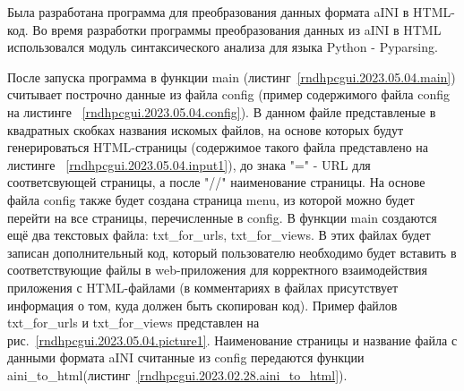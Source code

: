 \def\notedate{2023.05.04}
\def\currentauthor{Василян А.Р. (РК6-83Б)}



Была разработана программа для преобразования данных формата \textsf{aINI} в \textsf{HTML}-код. Во время разработки программы преобразования данных из \textsf{aINI} в \textsf{HTML} использовался модуль синтаксического анализа для языка \textsf{Python} - \textsf{Pyparsing}. 

После запуска программа в функции \textsf{main} (листинг~\ref{rndhpcgui.2023.05.04.main}) считывает построчно данные из файла \textsf{config} (пример содержимого файла \textsf{config} на листинге ~\ref{rndhpcgui.2023.05.04.config}). В данном файле представленые в квадратных скобках названия искомых файлов, на основе которых будут генерироваться \textsf{HTML}-страницы (содержимое такого файла представлено на листинге ~\ref{rndhpcgui.2023.05.04.input1}), до знака "=" - \textsf{URL} для соответсвующей страницы, а после "//" наименование страницы. На основе файла \textsf{config} также будет создана страница menu, из которой можно будет перейти на все страницы, перечисленные в \textsf{config}. В функции \textsf{main} создаются ещё два текстовых файла: \textsf{txt_for_urls}, \textsf{txt_for_views}. В этих файлах будет записан дополнительный код, который пользователю необходимо будет вставить в соответствующие файлы в \textsf{web}-приложения для корректного взаимодействия приложения с \textsf{HTML}-файлами (в комментариях в файлах присутствует информация о том, куда должен быть скопирован код). Пример файлов \textsf{txt_for_urls} и \textsf{txt_for_views} представлен на рис.~\ref{rndhpcgui.2023.05.04.picture1}. Наименование страницы и название файла с данными формата \textsf{aINI} считанные из \textsf{config} передаются функции \textsf{aini_to_html}(листинг~\ref{rndhpcgui.2023.02.28.aini_to_html}).


